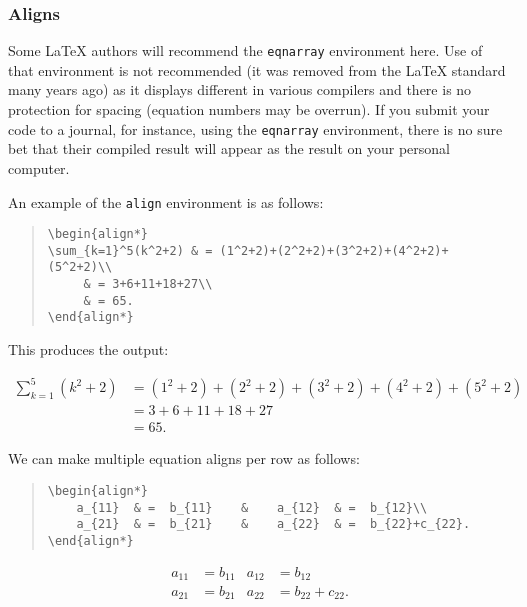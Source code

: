 \documentclass[letterpaper,twoside,10pt]{article}
\begin{document}
\subsubsection{Aligns}

Some {\LaTeX} authors will recommend the \verb!eqnarray! environment here. Use of that environment
is not recommended (it was removed from the {\LaTeX} standard many years ago) as it displays
different in various compilers and there is no protection for spacing (equation numbers may be
overrun). If you submit your code to a journal, for instance, using the \verb!eqnarray! environment,
there is no sure bet that their compiled result will appear as the result on your personal computer.

\bigbreak An example of the \verb!align! environment is as follows:

\begin{quote}
\begin{verbatim}
\begin{align*}
\sum_{k=1}^5(k^2+2) & = (1^2+2)+(2^2+2)+(3^2+2)+(4^2+2)+(5^2+2)\\
     & = 3+6+11+18+27\\
     & = 65.
\end{align*}
\end{verbatim}
\end{quote}

This produces the output:

\begin{align*}
\sum_{k=1}^5(k^2+2) & = (1^2+2)+(2^2+2)+(3^2+2)+(4^2+2)+(5^2+2)\\
     & = 3+6+11+18+27\\
     & = 65.
\end{align*}



We can make multiple equation aligns per row as follows:

\begin{quote}
\begin{verbatim}
\begin{align*}
    a_{11}  & =  b_{11}    &    a_{12}  & =  b_{12}\\
    a_{21}  & =  b_{21}    &    a_{22}  & =  b_{22}+c_{22}.
\end{align*}
\end{verbatim}
\end{quote}

\begin{align*}
a_{11}	& =b_{11}&
  a_{12}& =b_{12}\\
a_{21}& =b_{21}&
  a_{22}& =b_{22}+c_{22}.
\end{align*}
\end{document}
